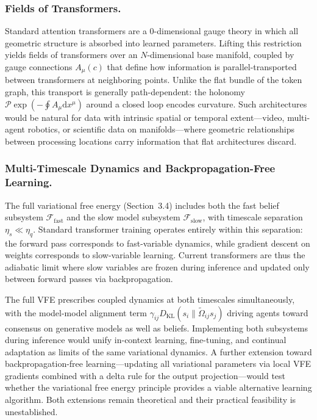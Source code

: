 \documentclass[twoside,11pt]{article}
\begin{document}
\subsubsection{Fields of Transformers.}

Standard attention transformers are a 0-dimensional gauge theory in which all geometric structure is absorbed into learned parameters. Lifting this restriction yields fields of transformers over an $N$-dimensional base manifold, coupled by gauge connections $A_\mu(c)$ that define how information is parallel-transported between transformers at neighboring points. Unlike the flat bundle of the token graph, this transport is generally path-dependent: the holonomy $\mathcal{P}\exp \left(-\oint A_\mu \mathrm{d}x^\mu\right)$ around a closed loop encodes curvature. Such architectures would be natural for data with intrinsic spatial or temporal extent---video, multi-agent robotics, or scientific data on manifolds---where geometric relationships between processing locations carry information that flat architectures discard.

\subsubsection{Multi-Timescale Dynamics and Backpropagation-Free Learning.}

The full variational free energy (Section~3.4) includes both the fast belief subsystem $\mathcal{F}_{\text{fast}}$ and the slow model subsystem $\mathcal{F}_{\text{slow}}$, with timescale separation $\eta_s \ll \eta_q$. Standard transformer training operates entirely within this separation: the forward pass corresponds to fast-variable dynamics, while gradient descent on weights corresponds to slow-variable learning. Current transformers are thus the adiabatic limit where slow variables are frozen during inference and updated only between forward passes via backpropagation.

The full VFE prescribes coupled dynamics at both timescales simultaneously, with the model-model alignment term $\gamma_{ij} D_{\mathrm{KL}}(s_i \| \tilde{\Omega}_{ij} s_j)$ driving agents toward consensus on generative models as well as beliefs. Implementing both subsystems during inference would unify in-context learning, fine-tuning, and continual adaptation as limits of the same variational dynamics. A further extension toward backpropagation-free learning---updating all variational parameters via local VFE gradients combined with a delta rule for the output projection---would test whether the variational free energy principle provides a viable alternative learning algorithm. Both extensions remain theoretical and their practical feasibility is unestablished.
\end{document}
